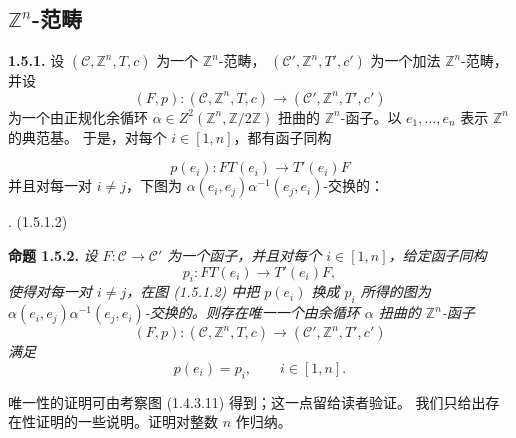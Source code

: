 \clearpage
{}%
\subsection{\texorpdfstring{$\mathbb Z^n$}{Z n}-范畴}

\noindent\textbf{1.5.1.}\quad
设 $(\mathcal C,\mathbb Z^n,T,c)$ 为一个 $\mathbb Z^n$-范畴，
$(\mathcal C',\mathbb Z^n,T',c')$ 为一个加法 $\mathbb Z^n$-范畴，并设
\[
  (F,p)\colon(\mathcal C,\mathbb Z^n,T,c)
  \longrightarrow(\mathcal C',\mathbb Z^n,T',c')
\]
为一个由正规化余循环
$\alpha\in Z^2(\mathbb Z^n,\mathbb Z/2\mathbb Z)$ 扭曲的
$\mathbb Z^n$-函子。以 $e_1,\ldots,e_n$ 表示 $\mathbb Z^n$ 的典范基。
于是，对每个 $i\in[1,n]$，都有函子同构

\begin{equation}
  p(e_i)\colon FT(e_i)\longrightarrow T'(e_i)F
  \tag{1.5.1.1}
\end{equation}
并且对每一对 $i\ne j$，下图为
$\alpha(e_i,e_j)\alpha^{-1}(e_j,e_i)$-交换的：

\begin{center}
  \;.
  \hfill\textup{(1.5.1.2)}
\end{center}

\noindent\textbf{命题 1.5.2.}\quad
\emph{设 $F\colon\mathcal C\to\mathcal C'$ 为一个函子，并且对每个
$i\in[1,n]$，给定函子同构
\[
  p_i\colon FT(e_i)\longrightarrow T'(e_i)F,
\]
使得对每一对 $i\ne j$，在图 (1.5.1.2) 中把 $p(e_i)$ 换成 $p_i$
所得的图为
$\alpha(e_i,e_j)\alpha^{-1}(e_j,e_i)$-交换的。则存在唯一一个由余循环
$\alpha$ 扭曲的 $\mathbb Z^n$-函子
\[
  (F,p)\colon(\mathcal C,\mathbb Z^n,T,c)
  \longrightarrow(\mathcal C',\mathbb Z^n,T',c')
\]
满足
\[
  p(e_i)=p_i,
  \qquad i\in[1,n].
\]}

唯一性的证明可由考察图 (1.4.3.11) 得到；这一点留给读者验证。
我们只给出存在性证明的一些说明。证明对整数 $n$ 作归纳。
